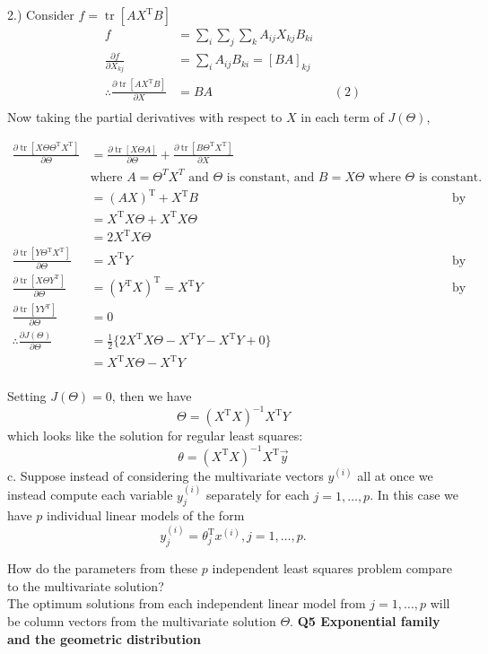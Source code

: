 \documentclass{article}
\begin{document}
2.) Consider \(f = \operatorname{tr}[AX^{\mathrm{T}}B]\)
\begin{align*}
    f & = \sum_i \sum_j \sum_k A_{ij}X_{kj} B_{ki}\\
    \frac{\partial f}{\partial X_{kj}} & = \sum_i A_{ij} B_{ki} = [BA]_{kj}\\
    \therefore \frac{\partial \operatorname{tr}[AX^{\mathrm{T}}B]}{\partial X} &= BA &&  (2)\\
\end{align*}
Now taking the partial derivatives with respect to \(X\) in each term of \(J(\Theta)\), 

\begin{align*}
    \frac{\partial \operatorname{tr}[X\Theta \Theta^{\mathrm{T}}X^{\mathrm{T}}]}{\partial \Theta} 
    & = \frac{\partial \operatorname{tr}[X\Theta A]}{\partial \Theta}  
    + \frac{\partial \operatorname{tr}[B\Theta^{\mathrm{T}}X^{\mathrm{T}}]}{\partial X}\\
    &\text{where \(A = \Theta^{T}X^T\) and \(\Theta\) is constant, and \(B = X\Theta\) where \(\Theta\) is constant.}\\
    & = (AX)^{\mathrm{T}} + X^{\mathrm{T}}B && \text{by (1) and (2)}\\
    & = X^{\mathrm{T}}X \Theta + X^{\mathrm{T}}X \Theta\\
    & = 2 X^{\mathrm{T}}X \Theta\\
    \frac{\partial \operatorname{tr}[Y\Theta ^{\mathrm{T}}X^{\mathrm{T}}]}{\partial \Theta}
    & = X^{\mathrm{T}}Y && \text{by (2)}\\
    \frac{\partial \operatorname{tr}[X\Theta Y^{\mathrm{T}}]}{\partial \Theta}
    & = (Y^{\mathrm{T}}X)^{\mathrm{T}} = X^{\mathrm{T}} Y && \text{by (1)}\\
    \frac{\partial \operatorname{tr}[YY^{\mathrm{T}}]}{\partial \Theta}
    & = 0\\
    \therefore \frac{\partial J(\Theta)}{\partial \Theta}
    & = \frac{1}{2} \{2 X^{\mathrm{T}}X \Theta - X^{\mathrm{T}} Y - X^{\mathrm{T}} Y + 0 \}\\
    & =  X^{\mathrm{T}}X \Theta - X^{\mathrm{T}} Y \\
\end{align*}

Setting \(J(\Theta) = 0\), then we have 
\[
    \Theta = (X^{\mathrm{T}}X)^{-1} X^{\mathrm{T}} Y 
\]
which looks like the solution for regular least squares: 
\[
    \theta = (X^{\mathrm{T}}X)^{-1} X^{\mathrm{T}} \vec{y}
\]
c. Suppose instead of considering the multivariate vectors \(y^{(i)}\) all at once we instead
compute each variable \(y_j ^ {(i)}\) separately for each \( j = 1, \ldots , p\).
In this case we have \(p \) individual linear models of the form 
\[
    y_j ^ {(i)} = \theta_j ^{\mathrm{T}} x^ {(i)}, j = 1, \ldots , p.
\]

How do the parameters from these \(p\) independent least squares problem compare to the 
multivariate solution?\\
The optimum solutions from each independent linear model from \(j = 1, \ldots , p\) will 
be column vectors from the multivariate solution \(\Theta\).
\clearpage
{\large \bf Q5 Exponential family and the geometric distribution}\\
\end{document}
